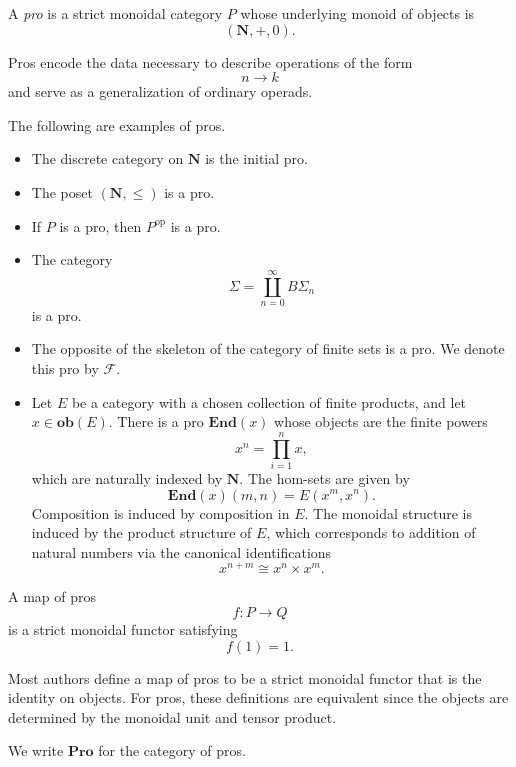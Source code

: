 \documentclass{tac}
\begin{document}
\begin{definition}
A \emph{pro} is a strict monoidal category $P$ whose underlying monoid of objects is
\[
(\mathbf{N},+,0).
\]
\end{definition}

Pros encode the data necessary to describe operations of the form
\[
n\to k
\]
and serve as a generalization of ordinary operads.

\begin{example}\label{examples of pros}
The following are examples of pros.
\begin{itemize}
    \item The discrete category on $\mathbf{N}$ is the initial pro.
    \item The poset $(\mathbf{N},\leq)$ is a pro.
    \item If $P$ is a pro, then $P^{\mathrm{op}}$ is a pro.
    \item The category
    \[
    \Sigma=\coprod_{n=0}^{\infty}B\Sigma_n
    \]
    is a pro.
    \item The opposite of the skeleton of the category of finite sets is a pro. We denote this pro by $\mathcal{F}$.
    \item Let $E$ be a category with a chosen collection of finite products, and let $x\in\mathbf{ob}(E)$. There is a pro $\mathbf{End}(x)$ whose objects are the finite powers
    \[
    x^n=\prod_{i=1}^{n}x,
    \]
    which are naturally indexed by $\mathbf{N}$. The hom-sets are given by
    \[
    \mathbf{End}(x)(m,n)=E(x^m,x^n).
    \]
    Composition is induced by composition in $E$. The monoidal structure is induced by the product structure of $E$, which corresponds to addition of natural numbers via the canonical identifications
    \[
    x^{n+m}\cong x^n\times x^m.
    \]
\end{itemize}
\end{example}

\begin{definition}
A map of pros
\[
f:P\to Q
\]
is a strict monoidal functor satisfying
\[
f(1)=1.
\]
\end{definition}

Most authors define a map of pros to be a strict monoidal functor that is the identity on objects. For pros, these definitions are equivalent since the objects are determined by the monoidal unit and tensor product.

\begin{notation}
We write $\mathbf{Pro}$ for the category of pros.
\end{notation}
\end{document}
